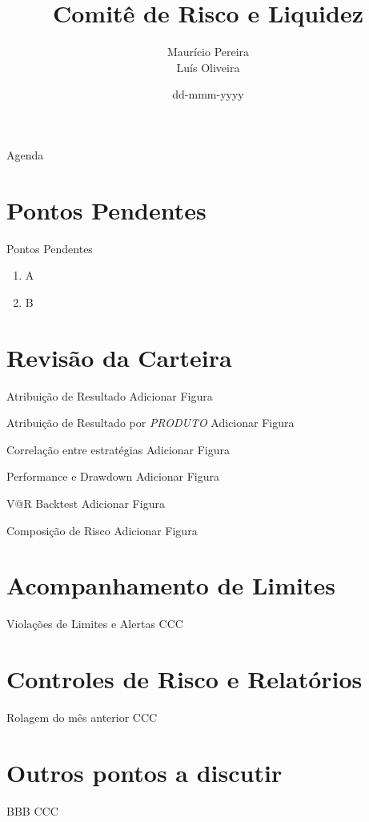\documentclass[handout,t,aspectratio=169]{beamer}
\title[Comitê de Risco]{
	Comitê de Risco e Liquidez}
\date{
	dd-mmm-yyyy}
\author[\url{risco@asset1.com.br}]{
	Maurício Pereira \inst{1}\\
	\vspace{0.25cm}
	Luís Oliveira \inst{2}}
\institute[Risco]{
	\inst{1}%
	\url{mauricio.pereira@asset1.com.br}\\
	\vspace{0.25cm}
	\inst{2}%
	\url{luis.oliveira@asset1.com.br}\\
}
\begin{document}
\frame{\titlepage}
\section[]{}
\begin{frame}{Agenda}
	\tableofcontents
\end{frame}

\section[Pendências]{Pontos Pendentes}
\begin{frame}{Pontos Pendentes}
	\begin{enumerate}
		\item A
		\item B  
	\end{enumerate}
\end{frame}

\section[Carteira]{Revisão da Carteira}
\begin{frame}{Atribuição de Resultado}
	{\color{red} Adicionar Figura}  
\end{frame}

\begin{frame}{Atribuição de Resultado por \emph{PRODUTO}}
	{\color{red} Adicionar Figura}  
\end{frame}

\begin{frame}{Correlação entre estratégias}
	{\color{red} Adicionar Figura}  
\end{frame}

\begin{frame}{Performance e Drawdown}
	{\color{red} Adicionar Figura}  
\end{frame}

\begin{frame}{V@R Backtest}
	{\color{red} Adicionar Figura}  
\end{frame}

\begin{frame}{Composição de Risco}
	{\color{red} Adicionar Figura}  
\end{frame}

\section[Limites]{Acompanhamento de Limites}
\begin{frame}{Violações de Limites e Alertas}
	CCC  
\end{frame}

\section[Risco]{Controles de Risco e Relatórios}
\begin{frame}{Rolagem do mês anterior}
	CCC  
\end{frame}

\section[Outros]{Outros pontos a discutir}
\begin{frame}{BBB}
	CCC  
\end{frame}
\end{document}

